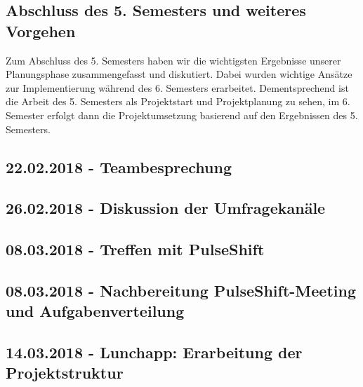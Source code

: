 \subsection{Abschluss des 5. Semesters und weiteres Vorgehen}
Zum Abschluss des 5. Semesters haben wir die wichtigsten Ergebnisse unserer Planungsphase zusammengefasst und diskutiert. Dabei wurden wichtige Ansätze zur Implementierung während des 6. Semesters erarbeitet. Dementsprechend ist die Arbeit des 5. Semesters als Projektstart und Projektplanung zu sehen, im 6. Semester erfolgt dann die Projektumsetzung basierend auf den Ergebnissen des 5. Semesters.

\subsection{22.02.2018 - Teambesprechung}

\subsection{26.02.2018 - Diskussion der Umfragekanäle}

\subsection{08.03.2018 - Treffen mit PulseShift}

\subsection{08.03.2018 - Nachbereitung PulseShift-Meeting und Aufgabenverteilung}

\subsection{14.03.2018 - Lunchapp: Erarbeitung der Projektstruktur}